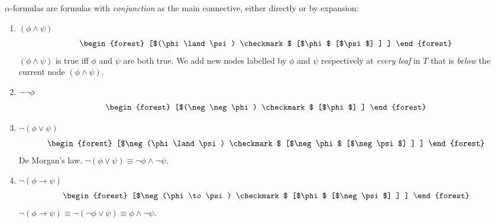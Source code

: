 \begin{definition}
    $\alpha$-formulas are formulas with \textit{conjunction} as the main connective,
    either directly or by expansion:
    
    \begin{enumerate}
        \item $(\phi \land \psi)$
            \begin{equation}
                \begin{forest}
                    [$(\phi \land \psi) \checkmark$
                        [$\phi$
                            [$\psi$]
                        ]
                    ]
                \end{forest}
            \end{equation}
            $(\phi \land \psi)$ is true iff $\phi$ and $\psi$ are both true.
            We add new nodes labelled by $\phi$ and $\psi$ respectively at
            \textit{every leaf} in $T$ that is \textit{below} the current node
            $(\phi \land \psi)$.
        \item $\neg \neg \phi$
            \begin{equation}
                \begin{forest}
                    [$(\neg \neg \phi) \checkmark$
                        [$\phi$]
                    ]
                \end{forest}
            \end{equation}
        \item $\neg (\phi \lor \psi)$
            \begin{equation}
                \begin{forest}
                    [$\neg (\phi \land \psi) \checkmark$
                        [$\neg \phi$
                            [$\neg \psi$]
                        ]
                    ]
                \end{forest}
            \end{equation}
            De Morgan's law. $\neg (\phi \lor \psi) \equiv \neg \phi \land \neg \psi$.
        \item $\neg (\phi \to \psi)$
            \begin{equation}
                \begin{forest}
                    [$\neg (\phi \to \psi) \checkmark$
                        [$\phi$
                            [$\neg \psi$]
                        ]
                    ]
                \end{forest}
            \end{equation}
            $\neg (\phi \to \psi) 
                \equiv \neg (\neg \phi \lor \psi)
                \equiv \phi \land \neg \psi$.
    \end{enumerate}
\end{definition}

